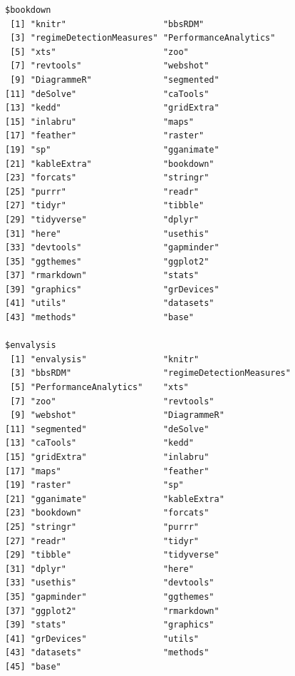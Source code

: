 \documentclass[12pt,twoside,openany]{reedthesis}
\begin{document}
\begin{verbatim}
$bookdown
 [1] "knitr"                   "bbsRDM"                 
 [3] "regimeDetectionMeasures" "PerformanceAnalytics"   
 [5] "xts"                     "zoo"                    
 [7] "revtools"                "webshot"                
 [9] "DiagrammeR"              "segmented"              
[11] "deSolve"                 "caTools"                
[13] "kedd"                    "gridExtra"              
[15] "inlabru"                 "maps"                   
[17] "feather"                 "raster"                 
[19] "sp"                      "gganimate"              
[21] "kableExtra"              "bookdown"               
[23] "forcats"                 "stringr"                
[25] "purrr"                   "readr"                  
[27] "tidyr"                   "tibble"                 
[29] "tidyverse"               "dplyr"                  
[31] "here"                    "usethis"                
[33] "devtools"                "gapminder"              
[35] "ggthemes"                "ggplot2"                
[37] "rmarkdown"               "stats"                  
[39] "graphics"                "grDevices"              
[41] "utils"                   "datasets"               
[43] "methods"                 "base"                   

$envalysis
 [1] "envalysis"               "knitr"                  
 [3] "bbsRDM"                  "regimeDetectionMeasures"
 [5] "PerformanceAnalytics"    "xts"                    
 [7] "zoo"                     "revtools"               
 [9] "webshot"                 "DiagrammeR"             
[11] "segmented"               "deSolve"                
[13] "caTools"                 "kedd"                   
[15] "gridExtra"               "inlabru"                
[17] "maps"                    "feather"                
[19] "raster"                  "sp"                     
[21] "gganimate"               "kableExtra"             
[23] "bookdown"                "forcats"                
[25] "stringr"                 "purrr"                  
[27] "readr"                   "tidyr"                  
[29] "tibble"                  "tidyverse"              
[31] "dplyr"                   "here"                   
[33] "usethis"                 "devtools"               
[35] "gapminder"               "ggthemes"               
[37] "ggplot2"                 "rmarkdown"              
[39] "stats"                   "graphics"               
[41] "grDevices"               "utils"                  
[43] "datasets"                "methods"                
[45] "base"                   


\end{verbatim}
\end{document}
